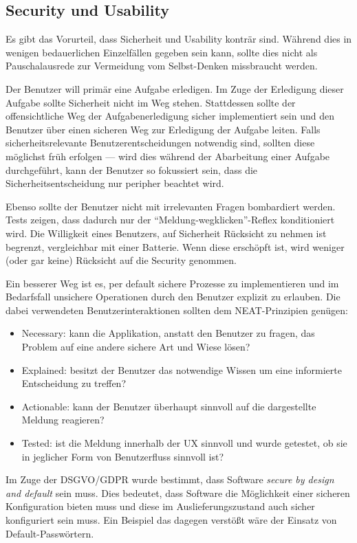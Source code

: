 \subsection{Security und Usability}

Es gibt das Vorurteil, dass Sicherheit und Usability konträr sind. Während dies in wenigen bedauerlichen Einzelfällen gegeben sein kann, sollte dies nicht als Pauschalausrede zur Vermeidung vom Selbst-Denken missbraucht werden.

Der Benutzer will primär eine Aufgabe erledigen. Im Zuge der Erledigung dieser Aufgabe sollte Sicherheit nicht im Weg stehen. Stattdessen sollte der offensichtliche Weg der Aufgabenerledigung sicher implementiert sein und den Benutzer über einen sicheren Weg zur Erledigung der Aufgabe leiten. Falls sicherheitsrelevante Benutzerentscheidungen notwendig sind, sollten diese möglichst früh erfolgen --- wird dies während der Abarbeitung einer Aufgabe durchgeführt, kann der Benutzer so fokussiert sein, dass die Sicherheitsentscheidung nur peripher beachtet wird.

Ebenso sollte der Benutzer nicht mit irrelevanten Fragen bombardiert werden. Tests zeigen, dass dadurch nur der ``Meldung-wegklicken''-Reflex konditioniert wird. Die Willigkeit eines Benutzers, auf Sicherheit Rücksicht zu nehmen ist begrenzt, vergleichbar mit einer Batterie. Wenn diese erschöpft ist, wird weniger (oder gar keine) Rücksicht auf die Security genommen.

Ein besserer Weg ist es, per default sichere Prozesse zu implementieren und im Bedarfsfall unsichere Operationen durch den Benutzer explizit zu erlauben. Die dabei verwendeten Benutzerinteraktionen sollten dem NEAT-Prinzipien genügen:

\begin{itemize}
	\item Necessary: kann die Applikation, anstatt den Benutzer zu fragen, das Problem auf eine andere sichere Art und Wiese lösen?
	\item Explained: besitzt der Benutzer das notwendige Wissen um eine informierte Entscheidung zu treffen?
	\item Actionable: kann der Benutzer überhaupt sinnvoll auf die dargestellte Meldung reagieren?
	\item Tested: ist die Meldung innerhalb der UX sinnvoll und wurde getestet, ob sie in jeglicher Form von Benutzerfluss sinnvoll ist?
\end{itemize}

Im Zuge der DSGVO/GDPR wurde bestimmt, dass Software \textit{secure by design and default} sein muss. Dies bedeutet, dass Software die Möglichkeit einer sicheren Konfiguration bieten muss und diese im Auslieferungszustand auch sicher konfiguriert sein muss. Ein Beispiel das dagegen verstößt wäre der Einsatz von Default-Passwörtern.

